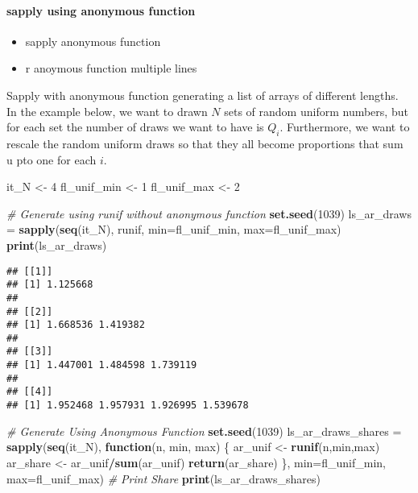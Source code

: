 \documentclass[
]{book}
\newenvironment{Shaded}{\begin{snugshade}}{\end{snugshade}}
\newcommand{\CommentTok}[1]{\textcolor[rgb]{0.56,0.35,0.01}{\textit{#1}}}
\newcommand{\ControlFlowTok}[1]{\textcolor[rgb]{0.13,0.29,0.53}{\textbf{#1}}}
\newcommand{\DataTypeTok}[1]{\textcolor[rgb]{0.13,0.29,0.53}{#1}}
\newcommand{\DecValTok}[1]{\textcolor[rgb]{0.00,0.00,0.81}{#1}}
\newcommand{\KeywordTok}[1]{\textcolor[rgb]{0.13,0.29,0.53}{\textbf{#1}}}
\newcommand{\NormalTok}[1]{#1}
\newcommand{\OperatorTok}[1]{\textcolor[rgb]{0.81,0.36,0.00}{\textbf{#1}}}
\newcommand{\StringTok}[1]{\textcolor[rgb]{0.31,0.60,0.02}{#1}}
\providecommand{\tightlist}{%
  \setlength{\itemsep}{0pt}\setlength{\parskip}{0pt}}
\begin{document}
\hypertarget{sapply-using-anonymous-function}{%
\paragraph{sapply using anonymous function}\label{sapply-using-anonymous-function}}

\begin{itemize}
\tightlist
\item
  sapply anonymous function
\item
  r anoymous function multiple lines
\end{itemize}

Sapply with anonymous function generating a list of arrays of different lengths. In the example below, we want to drawn \(N\) sets of random uniform numbers, but for each set the number of draws we want to have is \(Q_i\). Furthermore, we want to rescale the random uniform draws so that they all become proportions that sum u pto one for each \(i\).

\begin{Shaded}
\begin{Highlighting}[]
\NormalTok{it_N <-}\StringTok{ }\DecValTok{4}
\NormalTok{fl_unif_min <-}\StringTok{ }\DecValTok{1}
\NormalTok{fl_unif_max <-}\StringTok{ }\DecValTok{2}

\CommentTok{# Generate using runif without anonymous function}
\KeywordTok{set.seed}\NormalTok{(}\DecValTok{1039}\NormalTok{)}
\NormalTok{ls_ar_draws =}\StringTok{ }\KeywordTok{sapply}\NormalTok{(}\KeywordTok{seq}\NormalTok{(it_N),}
\NormalTok{                     runif,}
                     \DataTypeTok{min=}\NormalTok{fl_unif_min, }\DataTypeTok{max=}\NormalTok{fl_unif_max)}
\KeywordTok{print}\NormalTok{(ls_ar_draws)}
\end{Highlighting}
\end{Shaded}

\begin{verbatim}
## [[1]]
## [1] 1.125668
## 
## [[2]]
## [1] 1.668536 1.419382
## 
## [[3]]
## [1] 1.447001 1.484598 1.739119
## 
## [[4]]
## [1] 1.952468 1.957931 1.926995 1.539678
\end{verbatim}

\begin{Shaded}
\begin{Highlighting}[]
\CommentTok{# Generate Using Anonymous Function}
\KeywordTok{set.seed}\NormalTok{(}\DecValTok{1039}\NormalTok{)}
\NormalTok{ls_ar_draws_shares =}\StringTok{ }\KeywordTok{sapply}\NormalTok{(}\KeywordTok{seq}\NormalTok{(it_N),}
                            \ControlFlowTok{function}\NormalTok{(n, min, max) \{}
\NormalTok{                             ar_unif <-}\StringTok{ }\KeywordTok{runif}\NormalTok{(n,min,max)}
\NormalTok{                             ar_share <-}\StringTok{ }\NormalTok{ar_unif}\OperatorTok{/}\KeywordTok{sum}\NormalTok{(ar_unif)}
                             \KeywordTok{return}\NormalTok{(ar_share)}
\NormalTok{                            \},}
                            \DataTypeTok{min=}\NormalTok{fl_unif_min, }\DataTypeTok{max=}\NormalTok{fl_unif_max)}
\CommentTok{# Print Share}
\KeywordTok{print}\NormalTok{(ls_ar_draws_shares)}
\end{Highlighting}
\end{Shaded}
\end{document}
